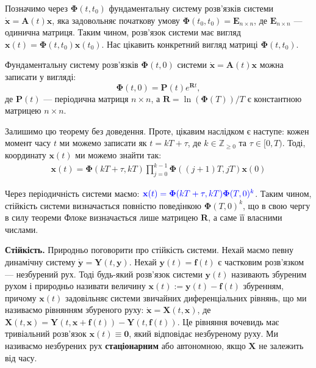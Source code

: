 \documentclass{hw_template}
\begin{document}
Позначимо через $\boldsymbol{\Phi}(t,t_0)$ фундаментальну систему розв'язків
системи $\dot{\mathbf{x}} = \mathbf{A}(t)\mathbf{x}$, яка задовольняє початкову
умову $\boldsymbol{\Phi}(t_0,t_0) = \mathbf{E}_{n \times n}$, де $\mathbf{E}_{n
\times n}$ --- одинична матриця. Таким чином, розв'язок системи має вигляд
$\mathbf{x}(t) = \boldsymbol{\Phi}(t,t_0)\mathbf{x}(t_0)$. Нас цікавить 
конкретний вигляд матриці $\boldsymbol{\Phi}(t,t_0)$.

\begin{theorem}
    Фундаментальну систему розв'язків $\boldsymbol{\Phi}(t,0)$ системи 
    $\dot{\mathbf{x}} = \mathbf{A}(t)\mathbf{x}$ можна записати у вигляді:
    \begin{equation*}
        \boldsymbol{\Phi}(t,0) = \mathbf{P}(t)e^{\mathbf{R}t},
    \end{equation*}
    де $\mathbf{P}(t)$ --- періодична матриця $n \times n$, а $\mathbf{R} =
    \ln(\boldsymbol{\Phi}(T))/T$ є константною матрицею $n \times n$.
\end{theorem}

Залишимо цю теорему без доведення. Проте, цікавим наслідком є наступе: 
кожен момент часу $t$ ми можемо записати як $t=kT+\tau$, де $k \in \mathbb{Z}_{\geq 0}$
та $\tau \in [0,T)$. Тоді, координату $\mathbf{x}(t)$ ми можемо знайти так:
\begin{align*}
    \mathbf{x}(t) = \boldsymbol{\Phi}(kT+\tau,kT)\prod_{j=0}^{k-1}\boldsymbol{\Phi}((j+1)T,jT)\mathbf{x}(0)
\end{align*}

Через періодичність системи маємо: $\textcolor{blue}{\mathbf{x}(t) =
\boldsymbol{\Phi}(kT+\tau,kT)\boldsymbol{\Phi}(T,0)^k}$. Таким чином, стійкість
системи визначається повністю поведінкою $\boldsymbol{\Phi}(T,0)^k$, що в свою 
чергу в силу теореми Флоке визначається лише матрицею $\mathbf{R}$, а саме її 
власними числами. 

\textbf{Стійкість.} Природньо поговорити про стійкість системи. Нехай маємо
певну динамічну систему $\dot{\mathbf{y}} = \mathbf{Y}(t,\mathbf{y})$. Нехай
$\mathbf{y}(t)=\boldsymbol{f}(t)$ є частковим розв'язком --- незбурений рух.
Тоді будь-який розв'язок системи $\mathbf{y}(t)$ називають збуреним рухом і
природньо називати величину $\mathbf{x}(t) := \mathbf{y}(t)-\boldsymbol{f}(t)$
збуренням, причому $\mathbf{x}(t)$ задовільняє системи звичайних диференціальних
рівнянь, що ми називаємо рівнянням збуреного руху: $\dot{\mathbf{x}} =
\mathbf{X}(t,\mathbf{x})$, де $\mathbf{X}(t,\mathbf{x}) =
\mathbf{Y}(t,\mathbf{x}+\boldsymbol{f}(t)) - \mathbf{Y}(t,\boldsymbol{f}(t))$.
Це рівняння вочевидь має тривіальний розв'язок $\mathbf{x}(t) \equiv
\mathbf{0}$, який відповідає незбуреному руху. Ми називаємо незбурених рух
\textbf{стаціонарним} або автономною, якщо $\mathbf{X}$ не залежить від часу. 
\end{document}
